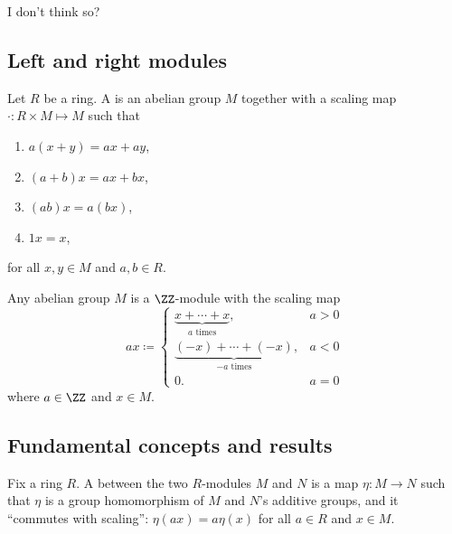 \documentclass{article}
\begin{document}
I don't think so?

\subsection{Left and right modules}

\begin{definition}
    Let $R$ be a ring.
    A  is an abelian group $M$ together with a scaling map $\cdot : R \times M \mapsto M$ such that
    \begin{enumerate}
        \item
            $a(x+y) = ax + ay$,
        \item 
            $(a+b)x = ax + bx$,
        \item 
            $(ab)x = a(bx)$,
        \item 
            $1x = x$,
    \end{enumerate}
    for all $x, y \in M$ and $a,b \in R$.
\end{definition}

\begin{proposition}
    Any abelian group $M$ is a $\ZZ$-module with the scaling map
    \[
        ax
        \coloneq
        \begin{cases}
            \underbrace{x + \cdots + x}_{a \text{ times}}, & a > 0 \\
            \underbrace{(-x) + \cdots + (-x)}_{-a \text{ times}}, & a < 0 \\
            0. & a = 0
        \end{cases}
    \]
    where $a \in \ZZ$ and $x \in M$.
\end{proposition}

\subsection{Fundamental concepts and results}

\begin{definition}
    Fix a ring $R$.
    A  between the two $R$-modules $M$ and $N$ is a map $\eta: M \to N$ such that $\eta$ is a group homomorphism of $M$ and $N$'s additive groups, and it ``commutes with scaling'': $\eta(ax) = a\eta(x)$ for all $a \in R$ and $x \in M$.
\end{definition}
\end{document}
